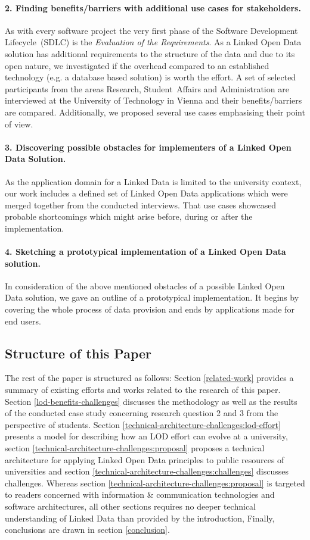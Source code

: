 \documentclass{article}
\begin{document}
\paragraph{2. Finding benefits/barriers with additional use cases for stakeholders.}
As with every software project the very first phase of the Software Development Lifecycle~(SDLC) is the \textit{Evaluation of the Requirements}. As a Linked Open Data solution has additional requirements to the structure of the data and due to its open nature, we investigated if the overhead compared to an established technology (e.g. a database based solution) is worth the effort. A set of selected participants from the areas Research, Student~Affairs and Administration are interviewed at the University of Technology in Vienna and their benefits/barriers are compared. Additionally, we proposed several use cases emphasising their point of view. 
\paragraph{3. Discovering possible obstacles for implementers of a Linked Open Data Solution.}
As the application domain for a Linked Data is limited to the university context, our work includes a defined set of Linked Open Data applications which were merged together from the conducted interviews. That use cases showcased probable shortcomings which might arise before, during or after the implementation.
\paragraph{4. Sketching a prototypical implementation of a Linked Open Data solution.}
In consideration of the above mentioned obstacles of a possible Linked Open Data solution, we gave an outline of a prototypical implementation. It begins by covering the whole process of data provision and ends by applications made for end users. 
\subsection{Structure of this Paper}
The rest of the paper is structured as follows: Section \ref{related-work} provides a summary of existing efforts and works related to the research of this paper. Section \ref{lod-benefits-challenges} discusses the methodology as well as the results of the conducted case study concerning research question 2 and 3 from the perspective of students. Section \ref{technical-architecture-challenges:lod-effort} presents a model for describing how an LOD effort can evolve at a university, section \ref{technical-architecture-challenges:proposal} proposes a technical architecture for applying Linked Open Data principles to public resources of universities and section \ref{technical-architecture-challenges:challenges} discusses challenges. Whereas section \ref{technical-architecture-challenges:proposal} is targeted to readers concerned with information \& communication technologies and software architectures, all other sections requires no deeper technical understanding of Linked Data than provided by the introduction, 
Finally, conclusions are drawn in section \ref{conclusion}.
\end{document}
